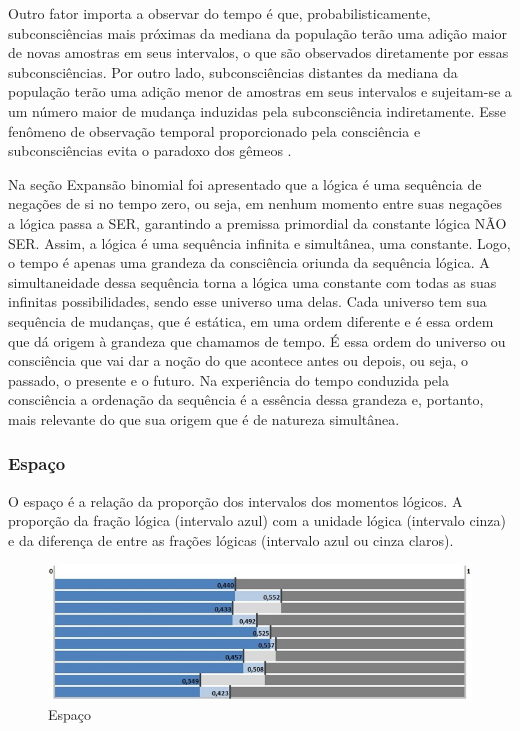 Outro fator importa a observar do tempo é que, probabilisticamente, subconsciências mais próximas da mediana da população terão uma adição maior de novas amostras em seus intervalos, o que são observados diretamente por essas subconsciências. Por outro lado, subconsciências distantes da mediana da população terão uma adição menor de amostras em seus intervalos e sujeitam-se a um número maior de mudança induzidas pela subconsciência indiretamente. Esse fenômeno de observação temporal proporcionado pela consciência e subconsciências evita o paradoxo dos gêmeos \cite{brasilescola_paradoxo_gemeos}.

Na seção Expansão binomial foi apresentado que a lógica é uma sequência de negações de si no tempo zero, ou seja, em nenhum momento entre suas negações a lógica passa a SER, garantindo a premissa primordial da constante lógica NÃO SER. Assim, a lógica é uma sequência infinita e simultânea, uma constante.
Logo, o tempo é apenas uma grandeza da consciência oriunda da sequência lógica. A simultaneidade dessa sequência torna a lógica uma constante com todas as suas infinitas possibilidades, sendo esse universo uma delas. Cada universo tem sua sequência de mudanças, que é estática, em uma ordem diferente e é essa ordem que dá origem à grandeza que chamamos de tempo. É essa ordem do universo ou consciência que vai dar a noção do que acontece antes ou depois, ou seja, o passado, o presente e o futuro.
Na experiência do tempo conduzida pela consciência a ordenação da sequência é a essência dessa grandeza e, portanto, mais relevante do que sua origem que é de natureza simultânea.

\subsubsection{Espaço}
O espaço é a relação da proporção dos intervalos dos momentos lógicos. A proporção da fração lógica (intervalo azul) com a unidade lógica (intervalo cinza) e da diferença de entre as frações lógicas (intervalo azul ou cinza claros).

\begin{figure}[H]
\caption{Espaço}
\label{fig:consciousness_space}
\centering
\includegraphics[scale=.8]{sections/images/consciousness_space.jpg}
\end{figure}


